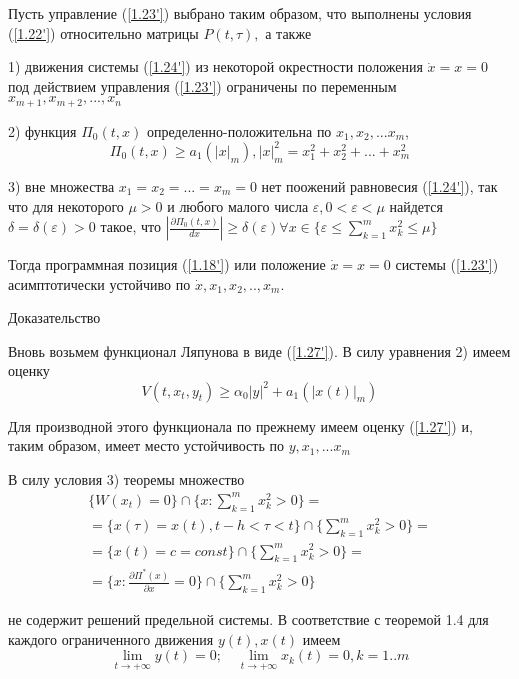 \begin{theorem}\label{t-1.9}
Пусть управление (\ref{1.23'}) выбрано таким образом, что выполнены условия (\ref{1.22'}) относительно матрицы $P(t, \tau),$ а также 

1) движения системы (\ref{1.24'}) из некоторой окрестности положения $\dot x = x= 0$ под действием управления (\ref{1.23'}) ограничены по переменным $x_{m+1}, x_{m+2}, ... , x_n$ 

2) функция $\Pi_0 (t, x)$ определенно-положительна по $x_1, x_2, ... x_m$,
$$\Pi_0(t, x) \ge a_1 (\left| x \right|_m), \left| x \right|^2_m = x_1^2 + x_2^2 + ... + x_m^2$$

3) вне множества ${x_1 = x_2 = ... = x_m = 0}$ нет поожений равновесия (\ref{1.24'}), так что для некоторого $\mu > 0$ и любого малого числа  $\varepsilon, 0 < \varepsilon < \mu$ найдется $\delta = \delta(\varepsilon) > 0$ такое, что $\left| \frac{\partial \Pi_0 (t, x)}{dx} \right| \ge \delta(\varepsilon) \forall x \in \lbrace \varepsilon \le \sum_{k = 1}^{m} x_k^2 \le \mu \rbrace$

Тогда программная позиция (\ref{1.18'}) или положение $\dot x = x = 0$ системы (\ref{1.23'}) асимптотически устойчиво по $\dot x, x_1, x_2,.., x_m.$
\end{theorem}

Доказательство 

Вновь возьмем функционал Ляпунова в виде (\ref{1.27'}). В силу уравнения 2) имеем оценку
$$
V(t, x_t, y_t) \ge \alpha_0 \left| y \right| ^2 + a_1 (\left| x(t) \right|_m)
$$

Для производной этого функционала по прежнему имеем оценку (\ref{1.27'}) и, таким образом, имеет место устойчивость по $y, x_1, ... x_m$

В силу условия 3) теоремы множество 
$$
\begin{array}{c}
\displaystyle \lbrace W(x_t) = 0 \rbrace \cap \lbrace x : \sum_{k = 1}^{m} x_k^2 > 0 \rbrace =\\
\displaystyle = \lbrace x(\tau) = x(t), t - h < \tau < t \rbrace \cap \lbrace \sum_{k = 1}^{m} x_k^2 > 0 \rbrace =\\
\displaystyle = \lbrace x(t) = c = const \rbrace \cap \lbrace \sum_{k = 1}^{m} x_k^2 > 0 \rbrace =\\
\displaystyle = \lbrace x: \frac{\partial \Pi^{*} (x)}{\partial x} = 0 \rbrace \cap \lbrace \sum_{k = 1}^{m} x_k^2 > 0 \rbrace
\end{array}
$$

не содержит решений предельной системы. В соответствие с теоремой 1.4 для каждого ограниченного движения $y(t), x(t)$ имеем
$$\lim_{t \to + \infty} y(t) = 0; \quad \lim_{t \to + \infty} x_k (t) = 0, k = 1..m$$


